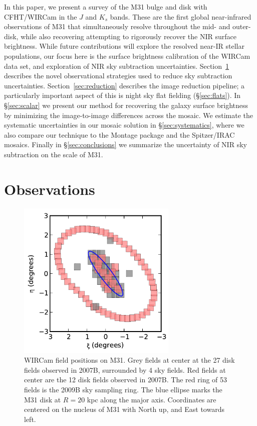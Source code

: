 \documentclass[iop]{emulateapj}
\begin{document}
In this paper, we present a survey of the M31 bulge and disk with CFHT/WIRCam in the $J$ and $K_s$ bands.
These are the first global near-infrared observations of M31 that simultaneously resolve throughout the mid- and outer-disk, while also recovering attempting to rigorously recover the NIR surface brightness.
While future contributions will explore the resolved near-IR stellar populations, our focus here is the surface brightness calibration of the WIRCam data set, and exploration of NIR sky subtraction uncertainties.
Section~\ref{sec:Observations} describes the novel observational strategies used to reduce sky subtraction uncertainties.
Section~\ref{sec:reduction} describes the image reduction pipeline; a particularly important aspect of this is night sky flat fielding (\S\ref{sec:flats}).
In \S\ref{sec:scalar} we present our method for recovering the galaxy surface brightness by minimizing the image-to-image differences across the mosaic.
We estimate the systematic uncertainties in our mosaic solution in \S\ref{sec:systematics}, where we also compare our technique to the Montage package \citep{Berriman:2008} and the Spitzer/IRAC mosaics.
Finally in \S\ref{sec:conclusions} we summarize the uncertainty of NIR sky subtraction on the scale of M31.

\section{Observations}
\label{sec:Observations}

\begin{figure}[t]
	\centering
		\includegraphics[width=3in]{figs/fieldmap}
	\caption{WIRCam field positions on M31. Grey fields at center at the 27 disk fields observed in 2007B, surrounded by 4 sky fields. Red fields at center are the 12 disk fields observed in 2007B. The red ring of 53 fields is the 2009B sky sampling ring. The blue ellipse marks the M31 disk at $R=20$ kpc along the major axis. Coordinates are centered on the nucleus of M31 with North up, and East towards left.}
	\label{fig:fieldmap}
\end{figure}
\end{document}
